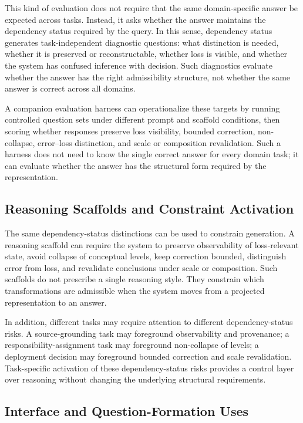 \documentclass[11pt]{article}
\begin{document}
This kind of evaluation does not require that the same domain-specific answer be expected across tasks. Instead, it asks whether the answer maintains the dependency status required by the query. In this sense, dependency status generates task-independent diagnostic questions: what distinction is needed, whether it is preserved or reconstructable, whether loss is visible, and whether the system has confused inference with decision. Such diagnostics evaluate whether the answer has the right admissibility structure, not whether the same answer is correct across all domains.

A companion evaluation harness can operationalize these targets by running controlled question sets under different prompt and scaffold conditions, then scoring whether responses preserve loss visibility, bounded correction, non-collapse, error--loss distinction, and scale or composition revalidation. Such a harness does not need to know the single correct answer for every domain task; it can evaluate whether the answer has the structural form required by the representation.

\subsection{Reasoning Scaffolds and Constraint Activation}

The same dependency-status distinctions can be used to constrain generation. A reasoning scaffold can require the system to preserve observability of loss-relevant state, avoid collapse of conceptual levels, keep correction bounded, distinguish error from loss, and revalidate conclusions under scale or composition. Such scaffolds do not prescribe a single reasoning style. They constrain which transformations are admissible when the system moves from a projected representation to an answer.

In addition, different tasks may require attention to different dependency-status risks. A source-grounding task may foreground observability and provenance; a responsibility-assignment task may foreground non-collapse of levels; a deployment decision may foreground bounded correction and scale revalidation. Task-specific activation of these dependency-status risks provides a control layer over reasoning without changing the underlying structural requirements.

\subsection{Interface and Question-Formation Uses}
\end{document}
